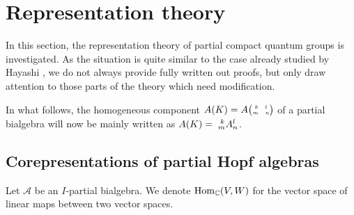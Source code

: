 \section{Representation theory}

In this section, the representation theory of partial compact quantum groups is investigated. As the situation is quite similar to the case already studied by Hayashi \cite{Hay1}, we do not always provide fully written out proofs, but only draw attention to those parts of the theory which need modification.

In what follows, the homogeneous component $A(K) = \eGr{A}{k}{l}{m}{n}$ of a partial bialgebra will now be mainly written as $A(K) = \Gr{A}{k}{l}{m}{n}$. 

\subsection{Corepresentations of partial Hopf algebras}

Let $\mathscr{A}$ be an $I$-partial bialgebra. We denote $\Hom_\C(V,W)$ for the vector space of linear maps between two vector spaces.

